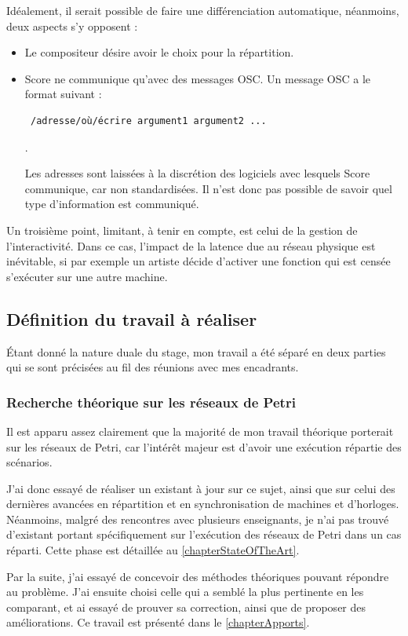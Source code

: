Idéalement, il serait possible de faire une différenciation automatique, néanmoins, deux aspects s'y opposent : 
\begin{itemize}
	\item Le compositeur désire avoir le choix pour la répartition.
	\item Score ne communique qu'avec des messages \ac{OSC}. Un message \ac{OSC} a le format suivant : 
	\begin{verbatim} /adresse/où/écrire argument1 argument2 ... \end{verbatim}.
	
	Les adresses sont laissées à la discrétion des logiciels avec lesquels Score communique, car non standardisées. Il n'est donc pas possible de savoir quel type d'information est communiqué. 
\end{itemize}
Un troisième point, limitant, à tenir en compte, est celui de la gestion de l'interactivité. Dans ce cas, l'impact de la latence due au réseau physique est inévitable, si par exemple un artiste décide d'activer une fonction qui est censée s'exécuter sur une autre machine.


\subsection{Définition du travail à réaliser}
Étant donné la nature duale du stage, mon travail a été séparé en deux parties qui se sont précisées au fil des réunions avec mes encadrants.

\subsubsection{Recherche théorique sur les réseaux de Petri}
Il est apparu assez clairement que la majorité de mon travail théorique porterait sur les réseaux de Petri, car l'intérêt majeur est d'avoir une exécution répartie des scénarios.

J'ai donc essayé de réaliser un existant à jour sur ce sujet, ainsi que sur celui des dernières avancées en répartition et en synchronisation de machines et d'horloges.
Néanmoins, malgré des rencontres avec plusieurs enseignants, je n'ai pas trouvé d'existant portant spécifiquement sur l'exécution des réseaux de Petri dans un cas réparti.
Cette phase est détaillée au \cref{chapterStateOfTheArt}.

Par la suite, j'ai essayé de concevoir des méthodes théoriques pouvant répondre au problème.
J'ai ensuite choisi celle qui a semblé la plus pertinente en les comparant, et ai essayé de prouver sa correction, ainsi que de proposer des améliorations.
Ce travail est présenté dans le \cref{chapterApports}.

